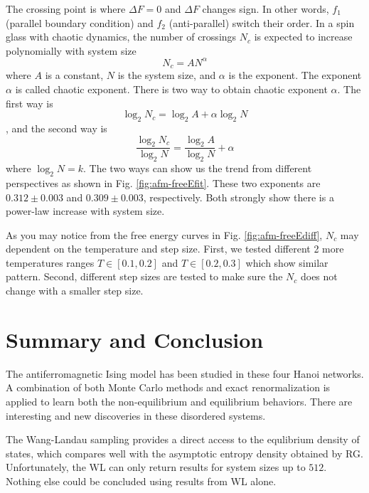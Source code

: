 The crossing point is where $\Delta F = 0$ and $\Delta F$ changes sign. In other words, $f_1$  (parallel boundary condition) and $f_2$ (anti-parallel) switch their order. In a spin glass with chaotic dynamics, the number of crossings $N_c$ is expected to increase polynomially with system size 
\begin{equation}
N_c = A N^\alpha
\end{equation}
where $A$ is a constant, $N$ is the system size, and $\alpha$ is the exponent. The exponent $\alpha$ is called chaotic exponent. There is two way to obtain chaotic exponent $\alpha$. The first way is 
\begin{equation}
\log_2 N_c = \log_2 A + \alpha \log_2 N
\label{eq:afm-fit1}
\end{equation}
, and the second way is 
\begin{equation}
\frac{\log_2 N_c }{\log_2 N } =\frac {\log_2 A }{\log_2{N}} + \alpha 
\label{eq:afm-fit2}
\end{equation}
where $\log_2 N = k$. The two ways can show us the trend from different perspectives as shown in Fig. \ref{fig:afm-freeEfit}. 
These two exponents are $0.312\pm 0.003$ and $0.309 \pm 0.003$, respectively. Both strongly show there is a power-law increase with system size. 

As you may notice from the free energy curves in Fig. \ref{fig:afm-freeEdiff}, $N_c$ may dependent on the temperature and step size. First, we tested different 2 more temperatures ranges $T \in [0.1, 0.2]$ and $T \in [0.2, 0.3]$ which show similar pattern. Second, different step sizes are tested to make sure the $N_c$ does not change with a smaller step size. 


\section{Summary and Conclusion}
The antiferromagnetic Ising model has been studied in these four Hanoi networks. A combination of both Monte Carlo methods and exact renormalization is applied to learn both the non-equilibrium and equilibrium behaviors. There are interesting and new discoveries in these disordered systems.

The Wang-Landau sampling provides a direct access to the equlibrium density of states, which compares well with the asymptotic entropy density obtained by RG. Unfortunately, the WL can only return results for system sizes up to $512$. Nothing else could be concluded using results from WL alone. 

